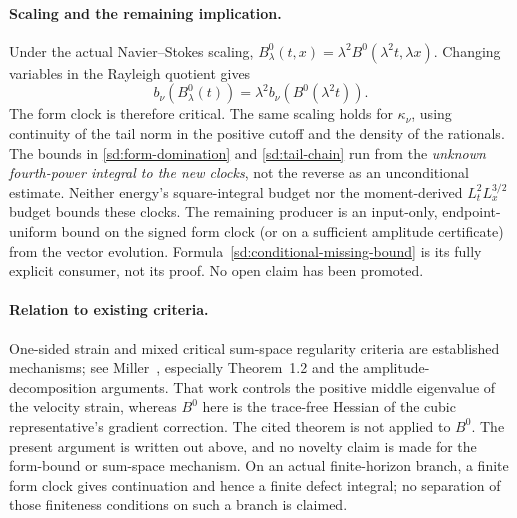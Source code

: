 \paragraph{Scaling and the remaining implication.}
Under the actual Navier--Stokes scaling,
$B^0_\lambda(t,x)=\lambda^2B^0(\lambda^2t,\lambda x)$.
Changing variables in the Rayleigh quotient gives
\[
 b_\nu(B^0_\lambda(t))=\lambda^2 b_\nu(B^0(\lambda^2t)).
\]
The form clock is therefore critical. The same scaling holds for
$\kappa_\nu$, using continuity of the tail norm in the positive cutoff
and the density of the rationals. The bounds in
\eqref{sd:form-domination} and \eqref{sd:tail-chain} run from the
\emph{unknown fourth-power integral to the new clocks}, not the reverse
as an unconditional estimate. Neither energy's square-integral budget nor
the moment-derived $L_t^2L_x^{3/2}$ budget bounds these clocks. The remaining
producer is an input-only, endpoint-uniform bound on the signed form
clock (or on a sufficient amplitude certificate) from the vector evolution.
Formula~\eqref{sd:conditional-missing-bound} is its fully explicit consumer,
not its proof. No open claim has been promoted.

\paragraph{Relation to existing criteria.}
One-sided strain and mixed critical sum-space regularity criteria are
established mechanisms; see Miller~\cite{Miller2021Sum}, especially
Theorem~1.2 and the amplitude-decomposition arguments. That work controls
the positive middle eigenvalue of the velocity strain, whereas $B^0$ here
is the trace-free Hessian of the cubic representative's gradient correction.
The cited theorem is not applied to $B^0$. The present argument is written
out above, and no novelty claim is made for the form-bound or sum-space
mechanism. On an actual finite-horizon branch, a finite form clock gives
continuation and hence a finite defect integral; no separation of those
finiteness conditions on such a branch is claimed.
